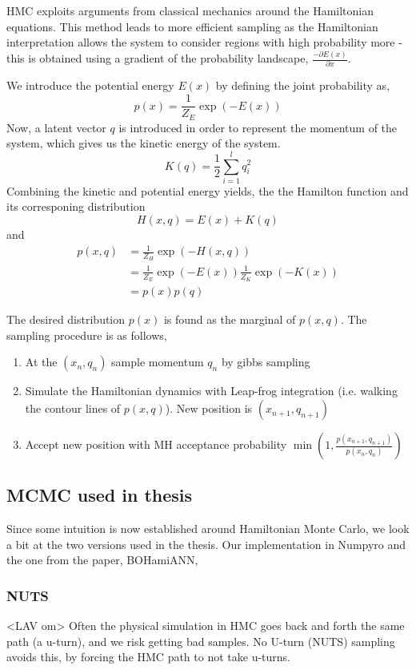 \begin{testexample}
HMC exploits arguments from classical mechanics around the Hamiltonian equations.
This method leads to more efficient sampling as the Hamiltonian interpretation allows the system to
consider regions with high probability more - this is obtained using a gradient of the probability
landscape, $\frac{-\partial E(x)}{\partial x} $.
 
We introduce the potential energy $E(x)$ by defining the joint probability as, 
$$p(x) = \frac{1}{Z_E}\exp(-E(x))$$ Now, a latent vector $q$ is introduced in order to represent the
momentum of the system, which gives us the kinetic energy of the system. 
$$K(q) = \frac{1}{2}\sum_{i=1}^l q_i^2$$ Combining the kinetic and potential energy yields, the the
Hamilton function and its corresponing distribution
$$H(x,q)= E(x)+K(q)$$
and 
\begin{align}
    p(x,q) &= \frac{1}{Z_H} \exp(-H(x,q))\\
    &= \frac{1}{Z_E} \exp(-E(x))\frac{1}{Z_K} \exp(-K(x))\\
    &= p(x)p(q)
\end{align}

The desired distribution $p(x)$ is found as the marginal of $p(x,q)$.
The sampling procedure is as follows, 
\begin{enumerate}[noitemsep]
    \item At the $(x_n,q_n)$ sample momentum $q_n$ by gibbs sampling
    \item Simulate the Hamiltonian dynamics with Leap-frog integration (i.e. walking the contour lines of $p(x,q)$).
    New position is $(x_{n+1}, q_{n+1})$
    \item Accept new position with MH acceptance probability $\min(1,\frac{p(x_{n+1}, q_{n+1})}{p(x_{n}, q_{n})} )$
\end{enumerate}
\end{testexample}

\subsection{MCMC used in thesis}
Since some intuition is now established around Hamiltonian Monte Carlo, 
we look a bit at the two versions used in the thesis. Our implementation in Numpyro
and the one from the paper, BOHamiANN, 

\subsubsection{NUTS}
<LAV om>
Often the physical simulation in HMC goes back and forth the same path (a u-turn), and we risk getting bad samples.
No U-turn (NUTS) sampling avoids this, by forcing the HMC path to not take u-turns. 

